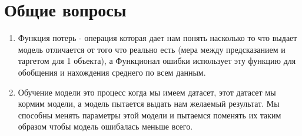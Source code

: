 \documentclass{article}
\begin{document}
\section{Общие вопросы}
\begin{enumerate}
    \item Функция потерь - операция которая дает нам понять насколько то что выдает модель отличается от того что реально есть (мера между предсказанием и таргетом для 1 объекта), а Функционал ошибки использует эту функцию для обобщения и нахождения среднего по всем данным.
    \item Обучение модели это процесс когда мы имеем датасет, этот датасет мы кормим модели, а модель пытается выдать нам желаемый результат. Мы способны менять параметры этой модели и пытаемся поменять их таким образом чтобы модель ошибалась меньше всего.
\end{enumerate}
\end{document}
